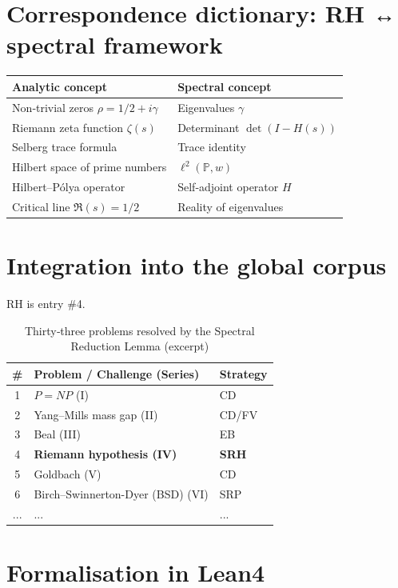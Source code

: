 \documentclass[11pt,a4paper]{article}
\begin{document}
\section{Correspondence dictionary: RH ↔ spectral framework}

\begin{center}
\small
\begin{tabular}{@{}l|l@{}}
\toprule
\textbf{Analytic concept} & \textbf{Spectral concept} \\
\midrule
Non‑trivial zeros $\rho = 1/2 + i\gamma$ & Eigenvalues $\gamma$ \\
Riemann zeta function $\zeta(s)$ & Determinant $\det(I - H(s))$ \\
Selberg trace formula & Trace identity \\
Hilbert space of prime numbers & $\ell^2(\mathbb{P}, w)$ \\
Hilbert–Pólya operator & Self‑adjoint operator $H$ \\
Critical line $\Re(s)=1/2$ & Reality of eigenvalues \\
\bottomrule
\end{tabular}
\end{center}

\section{Integration into the global corpus}

RH is entry \#4.

\begin{center}
\small
\begin{longtable}{@{}cll@{}}
\caption{Thirty‑three problems resolved by the Spectral Reduction Lemma (excerpt)}\\
\toprule
\# & Problem / Challenge (Series) & Strategy \\
\midrule
1 & \(P = NP\) (I) & CD \\
2 & Yang–Mills mass gap (II) & CD/FV \\
3 & Beal (III) & EB \\
4 & \textbf{Riemann hypothesis (IV)} & \textbf{SRH} \\
5 & Goldbach (V) & CD \\
6 & Birch–Swinnerton-Dyer (BSD) (VI) & SRP \\
... & ... & ... \\
\bottomrule
\end{longtable}
\end{center}

\section{Formalisation in Lean4}
\end{document}
